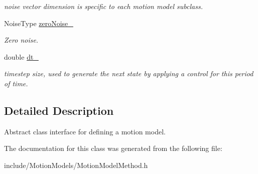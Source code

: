\begin{DoxyCompactItemize}
\begin{DoxyCompactList}\small\item\em noise vector dimension is specific to each motion model subclass. \end{DoxyCompactList}\item 
\hypertarget{class_motion_model_method_ac5b0a8829ec75b20d78deff84f71cbb5}{\-Noise\-Type \hyperlink{class_motion_model_method_ac5b0a8829ec75b20d78deff84f71cbb5}{zero\-Noise\-\_\-}}\label{class_motion_model_method_ac5b0a8829ec75b20d78deff84f71cbb5}

\begin{DoxyCompactList}\small\item\em \-Zero noise. \end{DoxyCompactList}\item 
\hypertarget{class_motion_model_method_a482972cd2ec0bec4b42137811e1d0446}{double \hyperlink{class_motion_model_method_a482972cd2ec0bec4b42137811e1d0446}{dt\-\_\-}}\label{class_motion_model_method_a482972cd2ec0bec4b42137811e1d0446}

\begin{DoxyCompactList}\small\item\em timestep size, used to generate the next state by applying a control for this period of time. \end{DoxyCompactList}\end{DoxyCompactItemize}


\subsection{\-Detailed \-Description}
\-Abstract class interface for defining a motion model. 

\-The documentation for this class was generated from the following file\-:\begin{DoxyCompactItemize}
\item 
include/\-Motion\-Models/\-Motion\-Model\-Method.\-h\end{DoxyCompactItemize}

